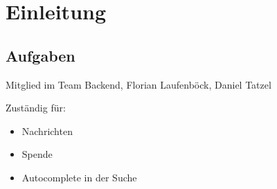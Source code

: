 \section{Einleitung} %
\subsection{Aufgaben} %

\begin{frame} %
	Mitglied im Team Backend, Florian Laufenböck, Daniel Tatzel
	
	Zuständig für:
	\begin{itemize}
	\item Nachrichten
	\item Spende
	\item Autocomplete in der Suche
	\end{itemize}
\end{frame}

